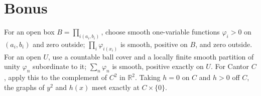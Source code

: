 \section{Bonus}

For an open box \(B = \prod_{i{({a_{i},b_{i}})}}\), choose smooth one-variable functions \(\varphi_{i} > 0\) on \(\left( {a_{i},b_{i}} \right)\) and zero outside; \(\prod_{i}\varphi_{i{(x_{i})}}\) is smooth, positive on \(B\), and zero outside. For an open \(U\), use a countable ball cover and a locally finite smooth partition of unity \(\varphi_{n}\) subordinate to it; \(\sum_{n}\varphi_{n}\) is smooth, positive exactly on \(U\). For Cantor \(C\), apply this to the complement of \(C^{2}\) in \(\mathbb{R}^{2}\). Taking \(h = 0\) on \(C\) and \(h > 0\) off \(C\), the graphs of \(y^{2}\) and \(h(x)\) meet exactly at \(C \times \{ 0\}\).
